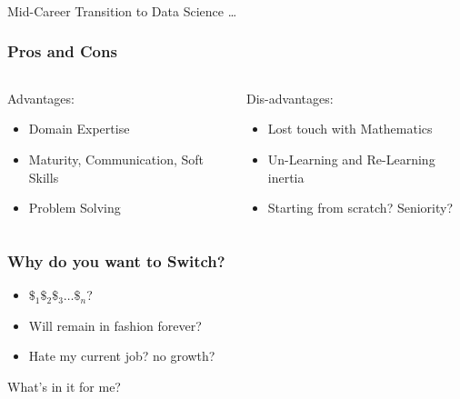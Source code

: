 \begin{frame}[fragile]\frametitle{}
	
	\begin{center}
	{\Large Mid-Career Transition to Data Science \ldots}  
	\end{center}

\end{frame}

\begin{frame}[fragile]\frametitle{Pros and Cons}
\begin{columns}
    \begin{column}[T]{0.5\linewidth}
		Advantages:
      \begin{itemize}
			\item Domain Expertise
			\item Maturity, Communication, Soft Skills
			\item Problem Solving
			\end{itemize}
		\end{column}
    \begin{column}[T]{0.5\linewidth}
		
		Dis-advantages:
      \begin{itemize}
			\item Lost touch with Mathematics
			\item Un-Learning and Re-Learning inertia
			\item Starting from scratch? Seniority?
			\end{itemize}
    \end{column}
  \end{columns}
\end{frame}

\begin{frame}[fragile]\frametitle{Why do you want to Switch?}

      \begin{itemize}
			\item $\$_1\$_2\$_3 \ldots \$_n$?
			\item Will remain in fashion forever?
			\item Hate my current job? no growth?
			\end{itemize}
			
			What's in it for me?
\end{frame}

